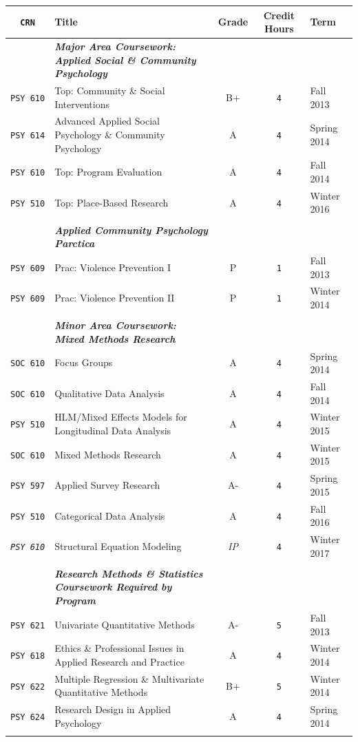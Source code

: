 \documentclass[]{tufte-book}
\newcommand{\rowgroup}[1]{\hspace{-1em}#1}
\begin{document}
\begin{longtable}[]{@{}clccl@{}}
\toprule
\texttt{CRN} & Title & Grade & Credit Hours & Term\tabularnewline
\midrule
\endhead
&
\rowgroup{\textbf{\textit{Major Area Coursework: Applied Social \& Community Psychology}}}
& & &\tabularnewline
\texttt{PSY\ 610} & Top: Community \& Social Interventions & B+ &
\texttt{4} & Fall 2013\tabularnewline
\texttt{PSY\ 614} & Advanced Applied Social Psychology \& Community
Psychology & A & \texttt{4} & Spring 2014\tabularnewline
\texttt{PSY\ 610} & Top: Program Evaluation & A & \texttt{4} & Fall
2014\tabularnewline
\texttt{PSY\ 510} & Top: Place-Based Research & A & \texttt{4} & Winter
2016\tabularnewline
\midrule & & & &\tabularnewline
& \rowgroup{\textbf{\textit{Applied Community Psychology Parctica}}} & &
&\tabularnewline
\texttt{PSY\ 609} & Prac: Violence Prevention I & P & \texttt{1} & Fall
2013\tabularnewline
\texttt{PSY\ 609} & Prac: Violence Prevention II & P & \texttt{1} &
Winter 2014\tabularnewline
\midrule & & & &\tabularnewline
&
\rowgroup{\textbf{\textit{Minor Area Coursework: Mixed Methods Research}}}
& & &\tabularnewline
\texttt{SOC\ 610} & Focus Groups & A & \texttt{4} & Spring
2014\tabularnewline
\texttt{SOC\ 610} & Qualitative Data Analysis & A & \texttt{4} & Fall
2014\tabularnewline
\texttt{PSY\ 510} & HLM/Mixed Effects Models for Longitudinal Data
Analysis & A & \texttt{4} & Winter 2015\tabularnewline
\texttt{SOC\ 610} & Mixed Methods Research & A & \texttt{4} & Winter
2015\tabularnewline
\texttt{PSY\ 597} & Applied Survey Research & A- & \texttt{4} & Spring
2015\tabularnewline
\texttt{PSY\ 510} & Categorical Data Analysis & A & \texttt{4} & Fall
2016\tabularnewline
\emph{\texttt{PSY\ 610}} & Structural Equation Modeling & \emph{IP} &
\texttt{4} & Winter 2017\tabularnewline
\midrule & & & &\tabularnewline
&
\rowgroup{\textbf{\textit{Research Methods \& Statistics Coursework Required by Program}}}
& & &\tabularnewline
\texttt{PSY\ 621} & Univariate Quantitative Methods & A- & \texttt{5} &
Fall 2013\tabularnewline
\texttt{PSY\ 618} & Ethics \& Professional Issues in Applied Research
and Practice & A & \texttt{4} & Winter 2014\tabularnewline
\texttt{PSY\ 622} & Multiple Regression \& Multivariate Quantitative
Methods & B+ & \texttt{5} & Winter 2014\tabularnewline
\texttt{PSY\ 624} & Research Design in Applied Psychology & A &
\texttt{4} & Spring 2014\tabularnewline
\midrule & & & &\tabularnewline
\bottomrule
\end{longtable}
\end{document}
